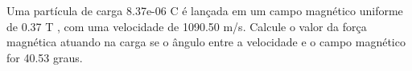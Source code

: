 \documentclass[12pt, addpoints]{exam}
\begin{document}
\begin{questions}
\begin{multicols*}{2}
\begin{oneparchoices}
\end{oneparchoices}
\question[20] Uma partícula de carga 8.37e-06 C é lançada em um campo magnético uniforme de    0.37 T , com uma velocidade de 1090.50 m/s. Calcule o valor da força magnética atuando na carga se o ângulo entre a velocidade e o campo magnético for   40.53 graus.

\begin{oneparchoices}
\end{oneparchoices}
\end{multicols*}
\end{questions}
\newpage
\end{document}
